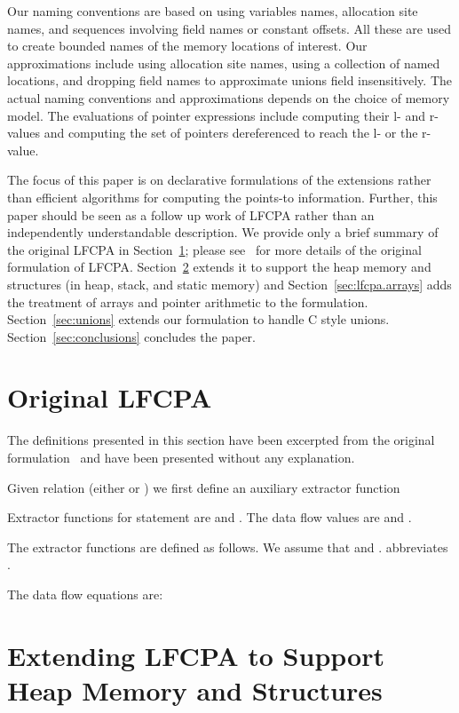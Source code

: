 \documentclass[a4paper,11pt,fleqn]{article}
\begin{document}
Our naming conventions are based on using variables names, allocation site names, and sequences
involving field names or constant offsets. All these are used to create bounded names
of the memory locations of interest. Our approximations include
using allocation site names, using a collection
of named locations, and dropping field names to approximate unions field insensitively.
The actual naming conventions and approximations depends on the choice of memory model.
The evaluations of pointer expressions
include computing their l- and r-values and computing the set of pointers dereferenced to 
reach the l- or the r-value. 



The focus of this paper is on declarative formulations of the
extensions rather than efficient algorithms for computing the points-to
information. Further, this paper should be seen as a follow up work of LFCPA rather than
an independently understandable description. We provide only a brief
summary of the original LFCPA in Section~\ref{sec:original.lfcpa};
please see~\cite{lfcpa} for more details of the original formulation
of LFCPA. Section~\ref{sec:lfcpa.heap} extends it to support the
heap memory and structures (in heap, stack, and static memory) and
Section~\ref{sec:lfcpa.arrays} adds the treatment of arrays and pointer
arithmetic to the formulation. Section~\ref{sec:unions} extends our
formulation to handle C style unions. Section~\ref{sec:conclusions}
concludes the paper.


\section{Original LFCPA}
\label{sec:original.lfcpa}

The definitions presented in this section have been excerpted from the original formulation~\cite{lfcpa}
and have been presented without any explanation.

Given relation  (either  or
) we first define an auxiliary extractor function


Extractor functions for statement  are \text{} and \text{}. The
data flow values are \text{} and
\text{}.

The extractor functions are defined as follows. We assume that \text{} and \text{}.  abbreviates .




The data flow equations are:

 


\section{Extending LFCPA to Support Heap Memory and Structures}
\label{sec:lfcpa.heap}
\end{document}
